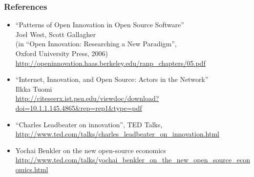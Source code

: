 
\begin{frame}
\frametitle{References}

\begin{itemize}
\item ``Patterns of Open Innovation in Open Source Software'' \\
  Joel West, Scott Gallagher \\
  (in ``Open Innovation: Researching a New Paradigm'', \\
  Oxford University Press, 2006) \\
  {\small \url{http://openinnovation.haas.berkeley.edu/ranp_chapters/05.pdf}}
\item ``Internet, Innovation, and Open Source: Actors in the Network'' \\
  Ilkka Tuomi \\
  {\small \url{http://citeseerx.ist.psu.edu/viewdoc/download?doi=10.1.1.145.4865&rep=rep1&type=pdf}}
\item ``Charles Leadbeater on innovation'', TED Talks, \\
  {\small \url{http://www.ted.com/talks/charles_leadbeater_on_innovation.html}}
\item Yochai Benkler on the new open-source economics \\
  {\small \url{http://www.ted.com/talks/yochai_benkler_on_the_new_open_source_economics.html}}
\end{itemize}
\end{frame}

